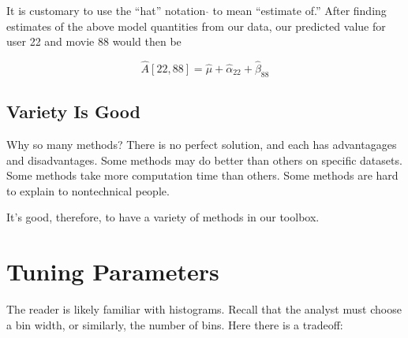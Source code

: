 It is customary to use the ``hat'' notation $\widehat{}$ to mean
``estimate of.''  After finding estimates of the above model quantities
from our data, our predicted value for user 22 and movie 88 would then
be

\begin{equation}
\widehat{A}[22,88] = \widehat{\mu} + \widehat{\alpha}_{22} + 
\widehat{\beta}_{88}
\end{equation}

\subsection{Variety Is Good}

Why so many methods?  There is no perfect solution, and each has
advantagages and disadvantages. 
Some methods may do better than
others on specific datasets.  Some methods take more computation time
than others.  Some methods are hard to explain to nontechnical people.

It's good, therefore, to have a variety of methods in our toolbox.

\section{Tuning Parameters}

The reader is likely familiar with histograms.  Recall that the analyst
must choose a bin width, or similarly, the number of bins.  Here there
is a tradeoff:

